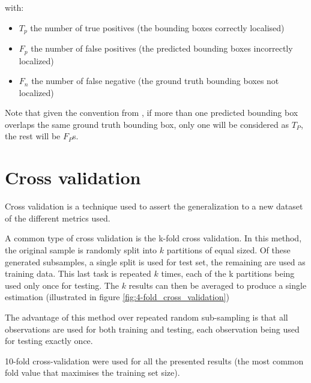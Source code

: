 with:
\begin{itemize}
   \item $T_p$ the number of true positives (the bounding boxes correctly localised)
   \item $F_p$ the number of false positives (the predicted bounding boxes incorrectly localized)
   \item $F_n$ the number of false negative (the ground truth bounding boxes not localized)
\end{itemize}

Note that given the convention from \cite{pascalVoc2012}, if more than one predicted bounding box overlaps the same ground truth bounding box, only one will be considered as $T_P$, the rest will be $F_P$s.

\section{Cross validation}

Cross validation is a technique used to assert the generalization to a new dataset of the different metrics used. 

A common type of cross validation is the k-fold cross validation. In this method, the original sample is randomly split into $k$ partitions of equal sized. Of these generated subsamples, a single split is used for test set, the remaining are used as training data.
This last task is repeated $k$ times, each of the k partitions being used only once for testing. The $k$ results can then be averaged to produce a single estimation (illustrated in figure  \ref{fig:4-fold_cross_validation})

The advantage of this method over repeated random sub-sampling is that all observations are used for both training and testing, each observation being used for testing exactly once. 

10-fold cross-validation were used for all the presented results (the most common fold value that maximises the training set size).

